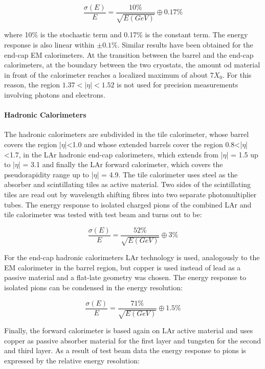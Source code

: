 \begin{equation}
\frac{\sigma (E)}{E} = \frac{10\%}{\sqrt{E(GeV)}} \oplus 0.17\%
\end{equation}

where 10\% is the stochastic term and 0.17\% is the constant term. The energy response is also linear within $\pm0.1\%$. Similar results have been obtained for the end-cap EM calorimeters.
At the transition between the barrel and the end-cap calorimeters, at the boundary between the two cryostats, the amount od material in front of the calorimeter reaches a localized maximum of about 7$X_0$. For this reason, the region $1.37<|\eta|<1.52$ is not used for precision measurements involving photons and electrons.

\paragraph{Hadronic Calorimeters}

The hadronic calorimeters are subdivided in the tile calorimeter, whose barrel covers the region |$\eta$|<1.0 and whose extended barrels cover the region 0.8<|$\eta$|<1.7, in the LAr hadronic end-cap calorimeters, which extends from |$\eta$| = 1.5 up to |$\eta$| = 3.1 and finally the LAr forward calorimeter, which covers the pseudorapidity range up to |$\eta$| = 4.9. The tile calorimeter uses steel as the absorber and scintillating tiles as active material. Two sides of the scintillating tiles are read out by wavelength shifting fibres into two separate photomultiplier tubes. The energy response to isolated charged pions of the combined LAr and tile calorimeter was tested with test beam and turns out to be:

\begin{equation}
\frac{\sigma (E)}{E} = \frac{52\%}{\sqrt{E(GeV)}} \oplus 3\%
\end{equation}

For the end-cap hadronic calorimeters LAr technology is used, analogously to the EM calorimeter in the barrel region, but copper is used instead of lead as a passive material and a flat-late geometry was chosen. The energy response to isolated pions can be condensed in the energy resolution:

\begin{equation}
\frac{\sigma (E)}{E} = \frac{71\%}{\sqrt{E(GeV)}} \oplus 1.5\%
\end{equation}

Finally, the forward calorimeter is based again on LAr active material and uses copper as passive absorber material for the first layer and tungsten for the second and third layer. As a result of test beam data the energy response to pions is expressed by the relative energy resolution:

